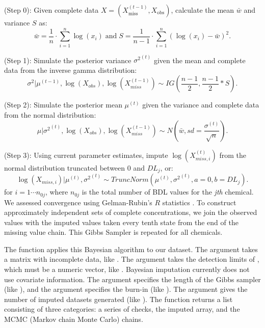 (Step 0): Given complete data
\(X = (X_{\text{miss}}^{(t-1)}, X_{\text{obs}})\), calculate the mean
\(\bar w\) and variance \(S\) as:
\[\bar w = \frac{1}{n} \cdot \sum_{i=1}^n \log \left(x_i \right) \; \text{and} \; S = \frac{1}{n-1} \cdot \sum_{i=1}^n \left(\log(x_i) - \bar w \right)^2 .\]

(Step 1): Simulate the posterior variance \({\sigma^2}^{(t)}\) given the
mean and complete data from the inverse gamma distribution:
\[\sigma^2|\mu^{(t-1)}, \log \left(X_{obs} \right), \log \left(X_{miss}^{(t-1)} \right) \sim IG \left( \frac{n-1}{2},  \frac{n-1}{2}*S \right).\]

(Step 2): Simulate the posterior mean \(\mu^{(t)}\) given the variance
and complete data from the normal distribution:
\[\mu | {\sigma^2}^{(t)}, \log \left(X_{obs} \right), \log \left(X_{miss}^{(t-1)} \right) \sim N \left(\bar w, sd = \frac{\sigma^{(t)}}{\sqrt{n}} \right).\]

(Step 3): Using current parameter estimates, impute
\(\log(X_{miss,i}^{(t)})\) from the normal distribution truncated
between 0 and \(DL_{j}\), or:
\[\log \left( X_{miss,i} \right )| \mu^{(t)},{\sigma^2}^{(t)}  \sim TruncNorm \left(\mu^{(t)},{\sigma^2}^{(t)}, a = 0, b = DL_j \right).\]
for \(i = 1 \cdots n_{0j}\), where \(n_{0j}\) is the total number of BDL
values for the \emph{jth} chemical. We assessed convergence using
Gelman-Rubin's \(R\) statistics
\citep{gelmanInferenceIterativeSimulation1992}. To construct
approximately independent sets of complete concentrations, we join the
observed values with the imputed values taken every tenth state from the
end of the missing value chain. This Gibbs Sampler is repeated for all
chemicals.

The  function applies this
Bayesian algorithm to our dataset. The  argument takes a matrix
with incomplete data, like . The 
argument takes the detection limits of , which must be a numeric
vector, like . Bayesian imputation currently does
not use covariate information. The  argument specifies the
length of the Gibbs sampler (like ), and the 
argument specifies the burn-in (like ). The  argument
gives the number of imputed datasets generated (like ). The
 function returns a list
consisting of three categories: a series of checks, the imputed array,
and the MCMC (Markov chain Monte Carlo) chains.

